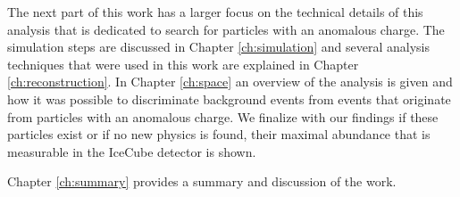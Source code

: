 The next part of this work has a larger focus on the technical details of this analysis that is dedicated to search for particles with an anomalous charge. The simulation steps are discussed in Chapter \ref{ch:simulation} and several analysis techniques that were used in this work are explained in Chapter \ref{ch:reconstruction}. In Chapter \ref{ch:space} an overview of the analysis is given and how it was possible to discriminate background events from events that originate from particles with an anomalous charge. We finalize with our findings if these particles exist or if no new physics is found, their maximal abundance that is measurable in the IceCube detector is shown.

Chapter \ref{ch:summary} provides a summary and discussion of the work.